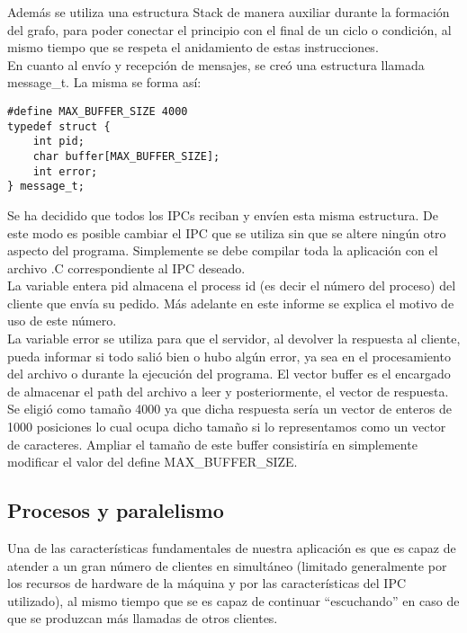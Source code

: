 \documentclass[a4paper, 10pt]{article}
\begin{document}
Además se utiliza una estructura Stack de manera auxiliar durante la formación del grafo, para poder conectar el principio con el final de un ciclo o condición, al mismo tiempo que se respeta el anidamiento de estas instrucciones.\\
	
En cuanto al envío y recepción de mensajes, se creó una estructura llamada message\_t. La misma se forma así:\\

\begin{lstlisting}
#define MAX_BUFFER_SIZE 4000
typedef struct {
	int pid;
	char buffer[MAX_BUFFER_SIZE];
	int error;
} message_t;
\end{lstlisting}
\vspace{1.5em}
\par Se ha decidido que todos los IPCs reciban y envíen esta misma estructura. De este modo es posible cambiar el IPC que se utiliza sin que se altere ningún otro aspecto del programa. Simplemente se debe compilar toda la aplicación con el archivo .C correspondiente al IPC deseado.\\

La variable entera pid almacena el process id (es decir el número del proceso) del cliente que envía su pedido. Más adelante en este informe se explica el motivo de uso de este número.\\

La variable error se utiliza para que el servidor, al devolver la respuesta al cliente, pueda informar si todo salió bien o hubo algún error, ya sea en el procesamiento del archivo o durante la ejecución del programa. El vector buffer es el encargado de almacenar el path del archivo a leer y posteriormente, el vector de respuesta. Se eligió como tamaño 4000 ya que dicha respuesta sería un vector de enteros de 1000 posiciones lo cual ocupa dicho tamaño si lo representamos como un vector de caracteres. Ampliar el tamaño de este buffer consistiría en simplemente modificar el valor del define MAX\_BUFFER\_SIZE.\\

\subsection{Procesos y paralelismo}

\par Una de las características fundamentales de nuestra aplicación es que es capaz de atender a un gran número de clientes en simultáneo (limitado generalmente por los recursos de hardware de la máquina y por las características del IPC utilizado), al mismo tiempo que se es capaz de continuar “escuchando” en caso de que se produzcan más llamadas de otros clientes.\\
\end{document}
